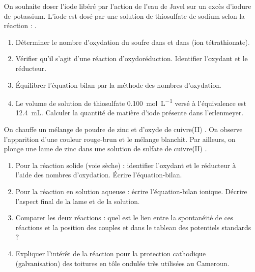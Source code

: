 \documentclass[11pt]{article}
\begin{document}
\begin{exercice}
On souhaite doser l'iode  libéré par l'action de l'eau de Javel sur un excès d'iodure de potassium. L'iode est dosé par une solution de thiosulfate de sodium  selon la réaction : .
\begin{enumerate}
    \item Déterminer le nombre d'oxydation du soufre dans  et dans  (ion tétrathionate).
    \item Vérifier qu'il s'agit d'une réaction d'oxydoréduction. Identifier l'oxydant et le réducteur.
    \item Équilibrer l'équation-bilan par la méthode des nombres d'oxydation.
    \item Le volume de solution de thiosulfate \SI{0.100}{mol.L^{-1}} versé à l'équivalence est \SI{12.4}{mL}. Calculer la quantité de matière d'iode  présente dans l'erlenmeyer.
\end{enumerate}
\end{exercice}

\begin{exercice}
On chauffe un mélange de poudre de zinc et d'oxyde de cuivre(II) . On observe l'apparition d'une couleur rouge-brun et le mélange blanchit. Par ailleurs, on plonge une lame de zinc dans une solution de sulfate de cuivre(II) .
\begin{enumerate}
    \item Pour la réaction solide (voie sèche) : identifier l'oxydant et le réducteur à l'aide des nombres d'oxydation. Écrire l'équation-bilan.
    \item Pour la réaction en solution aqueuse : écrire l'équation-bilan ionique. Décrire l'aspect final de la lame et de la solution.
    \item Comparer les deux réactions : quel est le lien entre la spontanéité de ces réactions et la position des couples  et  dans le tableau des potentiels standards ?
    \item Expliquer l'intérêt de la réaction  pour la protection cathodique (galvanisation) des toitures en tôle ondulée très utilisées au Cameroun.
\end{enumerate}
\end{exercice}
\end{document}
